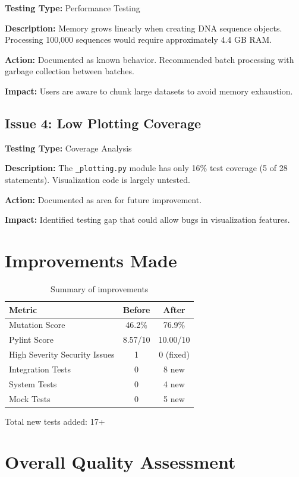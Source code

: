 \documentclass[11pt]{article}
\begin{document}
\textbf{Testing Type:} Performance Testing

\textbf{Description:} Memory grows linearly when creating DNA sequence objects. Processing 100,000 sequences would require approximately 4.4 GB RAM.

\textbf{Action:} Documented as known behavior. Recommended batch processing with garbage collection between batches.

\textbf{Impact:} Users are aware to chunk large datasets to avoid memory exhaustion.

\subsection{Issue 4: Low Plotting Coverage}

\textbf{Testing Type:} Coverage Analysis

\textbf{Description:} The \texttt{\_plotting.py} module has only 16\% test coverage (5 of 28 statements). Visualization code is largely untested.

\textbf{Action:} Documented as area for future improvement.

\textbf{Impact:} Identified testing gap that could allow bugs in visualization features.

\section{Improvements Made}

\begin{table}[h]
\centering
\begin{tabular}{lcc}
\toprule
\textbf{Metric} & \textbf{Before} & \textbf{After} \\
\midrule
Mutation Score & 46.2\% & 76.9\% \\
Pylint Score & 8.57/10 & 10.00/10 \\
High Severity Security Issues & 1 & 0 (fixed) \\
Integration Tests & 0 & 8 new \\
System Tests & 0 & 4 new \\
Mock Tests & 0 & 5 new \\
\bottomrule
\end{tabular}
\caption{Summary of improvements}
\end{table}

Total new tests added: 17+

\section{Overall Quality Assessment}
\end{document}
